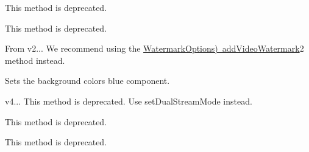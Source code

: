 \begin{DoxyRefList}
%
This method is deprecated. 
\item[Member \mbox{\hyperlink{classio_1_1agora_1_1rtc2_1_1_rtc_engine_a2502e34dd73becfa8d13104e5038e021}{io.agora.rtc2.Rtc\+Engine.push\+External\+Encoded\+Video\+Frame}} (Byte\+Buffer data, Encoded\+Video\+Frame\+Info frame\+Info)]\label{deprecated__deprecated000028}%
%
This method is deprecated. 
\item[Member \mbox{\hyperlink{classio_1_1agora_1_1rtc2_1_1_rtc_engine_a68b9c77f4879d0c3a9c23b608fb34f0b}{io.agora.rtc2.Rtc\+Engine.add\+Video\+Watermark}} (Agora\+Image watermark)]\label{deprecated__deprecated000029}%
%
From v2... We recommend using the \mbox{\hyperlink{}{Watermark\+Options) add\+Video\+Watermark}}2 method instead. 
\item[Member \mbox{\hyperlink{classio_1_1agora_1_1rtc2_1_1live_1_1_live_transcoding_aa92c543675d78a2aea35d91a2022ce2d}{io.agora.rtc2.live.Live\+Transcoding.set\+Blue}} (int blue)]\label{deprecated__deprecated000020}%
%
 Sets the background color\textquotesingle{}s blue component. 
\item[Member \mbox{\hyperlink{classio_1_1agora_1_1rtc2_1_1_rtc_engine_aea4bf3f92298a40c7b83be2fe3e52144}{io.agora.rtc2.Rtc\+Engine.enable\+Dual\+Stream\+Mode}} (boolean enabled, \mbox{\hyperlink{classio_1_1agora_1_1rtc2_1_1_simulcast_stream_config}{Simulcast\+Stream\+Config}} stream\+Config)]\label{deprecated__deprecated000031}%
%
v4... This method is deprecated. Use set\+Dual\+Stream\+Mode instead. 
\item[Member \mbox{\hyperlink{classio_1_1agora_1_1rtc2_1_1_rtc_engine_a6186606062e5fbe0ff3c6d67c50e68aa}{io.agora.rtc2.Rtc\+Engine.get\+Recommended\+Encoder\+Type}} ()]\label{deprecated__deprecated000032}%
%
This method is deprecated. 
\item[Member \mbox{\hyperlink{classio_1_1agora_1_1rtc2_1_1_rtc_engine_abdacfc92faddfb139a7494994f7eb54a}{io.agora.rtc2.Rtc\+Engine.enable\+High\+Perf\+Wifi\+Mode}} (boolean enable)]\label{deprecated__deprecated000033}%
%
This method is deprecated.  
\item[Member \mbox{\hyperlink{classio_1_1agora_1_1rtc2_1_1_rtc_engine_a13c23e98808f778c48dcd1eb03d4062b}{io.agora.rtc2.Rtc\+Engine.set\+Prefer\+Headset}} (boolean enabled)]\label{deprecated__deprecated000034}%

\end{DoxyRefList}
